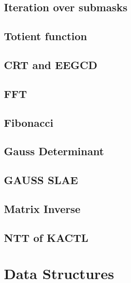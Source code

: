 \subsection{Iteration over submasks}
\raggedbottom
\hrulefill
\subsection{Totient function}
\raggedbottom
\hrulefill
\subsection{CRT and EEGCD}
\raggedbottom
\hrulefill
\subsection{FFT}
\raggedbottom
\hrulefill
\subsection{Fibonacci}
\raggedbottom
\hrulefill
\subsection{Gauss Determinant}
\raggedbottom
\hrulefill
\subsection{GAUSS SLAE}
\raggedbottom
\hrulefill
\subsection{Matrix Inverse}
\raggedbottom
\hrulefill
\subsection{NTT of KACTL}
\raggedbottom
\hrulefill

\section{Data Structures}
